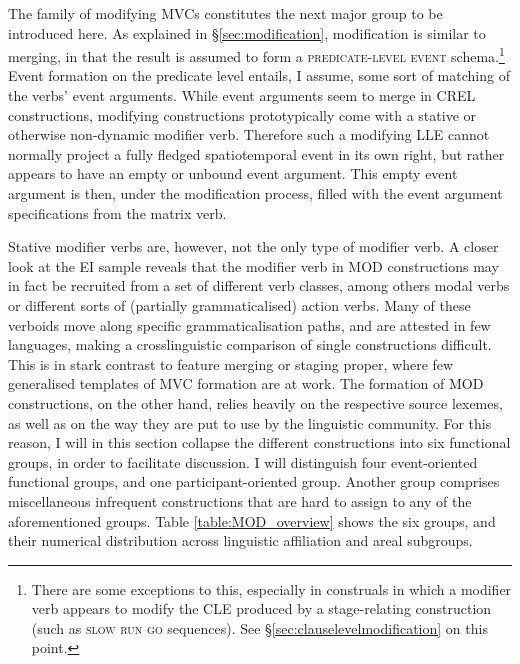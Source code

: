 The family of modifying MVCs constitutes the next major group to be introduced here. As explained in §\ref{sec:modification}, modification is similar to merging, in that the result is assumed to form a \textsc{predicate-level event} schema.\footnote{There are some exceptions to this, especially in construals in which a modifier verb appears to modify the CLE produced by a stage-relating construction (such as \textsc{slow} \textsc{run} \textsc{go} sequences). See §\ref{sec:clauselevelmodification} on this point.} Event formation on the predicate level entails, I assume, some sort of matching of the verbs' event arguments. While event arguments seem to merge in CREL constructions, modifying constructions prototypically come with a stative or otherwise non-dynamic modifier verb. Therefore such a modifying LLE cannot normally project a fully fledged spatiotemporal event in its own right, but rather appears to have an empty or unbound event argument. This empty event argument is then, under the modification process, filled with the event argument specifications from the matrix verb.

Stative modifier verbs are, however, not the only type of modifier verb. A closer look at the EI sample reveals that the modifier verb in MOD constructions may in fact be recruited from a set of different verb classes, among others modal verbs or different sorts of (partially grammaticalised) action verbs. Many of these verboids move along specific grammaticalisation paths, and are attested in few languages, making a crosslinguistic comparison of single constructions difficult. This is in stark contrast to feature merging or staging proper, where few generalised templates of MVC formation are at work. The formation of MOD constructions, on the other hand, relies heavily on the respective source lexemes, as well as on the way they are put to use by the linguistic community. For this reason, I will in this section collapse the different constructions into six functional groups, in order to facilitate discussion. I will distinguish four event-oriented functional groups, and one participant-oriented group. Another group comprises miscellaneous infrequent constructions that are hard to assign to any of the aforementioned groups. Table \ref{table:MOD_overview} shows the six groups, and their numerical distribution across linguistic affiliation and areal subgroups.

